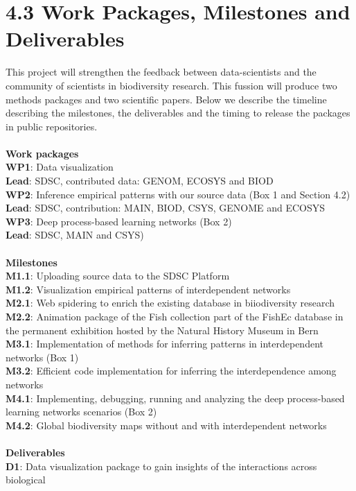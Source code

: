 \documentclass[11pt]{article}
\begin{document}
\section*{4.3 Work Packages, Milestones and Deliverables}
This project will strengthen the feedback between data-scientists and
the community of scientists in biodiversity research. This fussion
will produce two methods packages and two scientific papers. Below we
describe the timeline describing the milestones, the deliverables and
the timing to release the packages in public repositories.
\\
\\
{\bf Work packages}\\
{\bf WP1}: Data visualization\\
{\bf Lead}: SDSC, contributed data: GENOM, ECOSYS and BIOD\\
{\bf WP2}: Inference empirical patterns with our source data (Box 1 and Section 4.2)\\
{\bf Lead}: SDSC, contribution: MAIN, BIOD, CSYS, GENOME and ECOSYS\\
{\bf WP3}: Deep process-based learning networks (Box 2)\\
{\bf Lead}: SDSC, MAIN and CSYS)\\
\\
{\bf Milestones}\\
{\bf M1.1}: Uploading source data to the SDSC Platform\\
{\bf M1.2}: Visualization empirical patterns of interdependent networks\\
{\bf M2.1}: Web spidering to enrich the existing database in biiodiversity research\\
{\bf M2.2}: Animation package of the Fish collection part of the FishEc database in the
permanent exhibition hosted by the Natural History Museum in Bern\\
{\bf M3.1}: Implementation of methods for inferring patterns in interdependent networks (Box 1)\\
{\bf M3.2}: Efficient code implementation for inferring the interdependence among networks\\
{\bf M4.1}: Implementing, debugging, running and analyzing the deep process-based learning networks scenarios (Box 2)\\
{\bf M4.2}: Global biodiversity maps without and with interdependent networks\\
\\
{\bf Deliverables}\\
{\bf D1}: Data visualization package to gain insights of the interactions across biological
\end{document}

